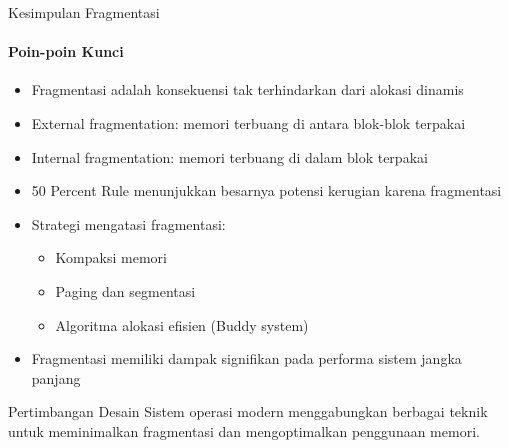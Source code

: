 \documentclass[10pt,aspectratio=169]{beamer}
\begin{document}
\begin{frame}{Kesimpulan Fragmentasi}
    \framesubtitle{Poin-poin Kunci}
    
    \begin{itemize}
        \item Fragmentasi adalah konsekuensi tak terhindarkan dari alokasi dinamis
        \item External fragmentation: memori terbuang di antara blok-blok terpakai
        \item Internal fragmentation: memori terbuang di dalam blok terpakai
        \item 50 Percent Rule menunjukkan besarnya potensi kerugian karena fragmentasi
        \item Strategi mengatasi fragmentasi:
        \begin{itemize}
            \item Kompaksi memori
            \item Paging dan segmentasi
            \item Algoritma alokasi efisien (Buddy system)
        \end{itemize}
        \item Fragmentasi memiliki dampak signifikan pada performa sistem jangka panjang
    \end{itemize}
    
    \begin{alertblock}{Pertimbangan Desain}
        Sistem operasi modern menggabungkan berbagai teknik untuk meminimalkan fragmentasi dan mengoptimalkan penggunaan memori.
    \end{alertblock}
\end{frame}

\backmatter %
\end{document}
